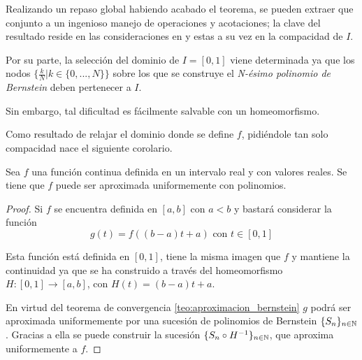 %

Realizando un repaso global habiendo acabado el teorema, se pueden extraer que conjunto a un ingenioso manejo de operaciones y acotaciones; la clave del resultado reside  en las consideraciones
en   y estas a su vez en la 
compacidad de $I$.

Por su parte, la selección del dominio de $I = [0,1]$ viene determinada ya que 
 los nodos $\{ \frac{k}{N} | k\in \{0,..., N\}\}$ sobre los que se construye el \textit{N-ésimo polinomio de Bernstein}  deben pertenecer a $I$.

Sin embargo, tal dificultad es fácilmente salvable con un homeomorfismo. 

Como resultado de relajar el dominio donde se define $f$, pidiéndole tan solo
compacidad nace el siguiente corolario.  

\begin{corolario} \label{teo:Teorema-Weierstrass}
    Sea $f$ una función continua definida en un intervalo real y con valores reales. Se tiene que $f$ puede ser aproximada uniformemente con polinomios. 
\end{corolario}  

\begin{proof}
    Si $f$ se encuentra definida en $[a,b]$ con $a<b$ y bastará considerar la función
    \begin{equation*}
        g(t) = f( (b-a)t + a) \text{ con } t \in [0,1]
    \end{equation*}

    Esta función está definida en $[0,1]$, tiene la misma imagen que $f$ y 
    mantiene la continuidad ya que se ha construido a través del homeomorfismo 
    $H:[0,1] \longrightarrow [a,b]$, con $H(t) = (b-a)t + a$. 

    En virtud del teorema de convergencia \ref{teo:aproximacion_bernstein}
    $g$ podrá ser aproximada uniformemente por una sucesión de polinomios de Bernstein $\{S_n\}_{n \in \mathbb{N}}$. Gracias a ella se puede
    construir la sucesión $\{S_n \circ H^{-1}\}_{n \in \mathbb{N}}$, que aproxima uniformemente a $f$. 
\end{proof}